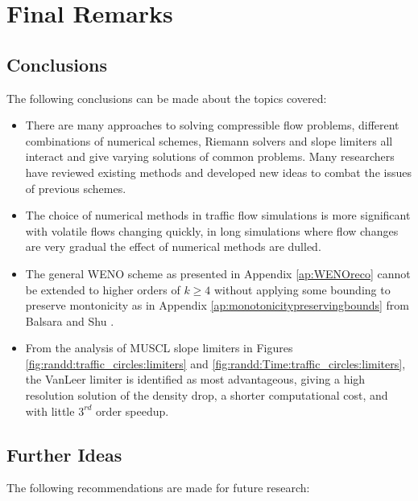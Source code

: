 \chapter{Final Remarks}
\label{ch:final}

\section{Conclusions}
\label{sec:conclusions}

	The following conclusions can be made about the topics covered:

	\begin{itemize}
		\item There are many approaches to solving compressible flow problems, different combinations of numerical schemes, Riemann solvers and slope limiters all interact and give varying solutions of common problems. Many researchers have reviewed existing methods and developed new ideas to combat the issues of previous schemes.
		\item The choice of numerical methods in traffic flow simulations is more significant with volatile flows changing quickly, in long simulations where flow changes are very gradual the effect of numerical methods are dulled.
		\item The general WENO scheme as presented in Appendix \ref{ap:WENOreco} cannot be extended to higher orders of $k\geq4$ without applying some bounding to preserve montonicity as in Appendix \ref{ap:monotonicitypreservingbounds} from Balsara and Shu \cite{BalsaraShu00}.
		\item From the analysis of MUSCL slope limiters in Figures \ref{fig:randd:traffic_circles:limiters} and \ref{fig:randd:Time:traffic_circles:limiters}, the VanLeer \cite{VanLeer74} limiter is identified as most advantageous, giving a high resolution solution of the density drop, a shorter computational cost, and with little $3^{rd}$ order speedup.
	\end{itemize}

\section{Further Ideas}
\label{sec:future}

The following recommendations are made for future research:
	
